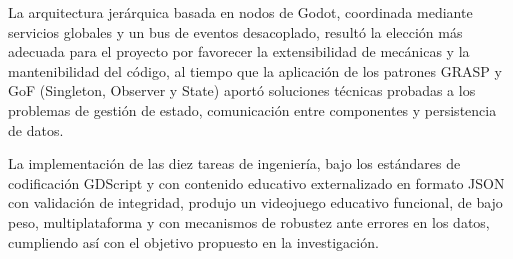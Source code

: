 La arquitectura jerárquica basada en nodos de Godot, coordinada mediante servicios globales y un bus de eventos desacoplado, resultó la elección más adecuada para el proyecto por favorecer la extensibilidad de mecánicas y la mantenibilidad del código, al tiempo que la aplicación de los patrones GRASP y GoF (Singleton, Observer y State) aportó soluciones técnicas probadas a los problemas de gestión de estado, comunicación entre componentes y persistencia de datos.

La implementación de las diez tareas de ingeniería, bajo los estándares de codificación GDScript y con contenido educativo externalizado en formato JSON con validación de integridad, produjo un videojuego educativo funcional, de bajo peso, multiplataforma y con mecanismos de robustez ante errores en los datos, cumpliendo así con el objetivo propuesto en la investigación.

